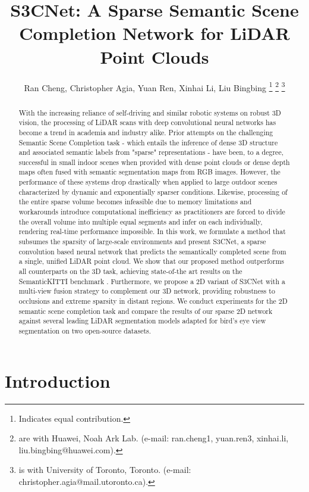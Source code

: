 \documentclass{article}
\title{S3CNet: A Sparse Semantic Scene Completion Network for LiDAR Point Clouds}
\author{
Ran Cheng, Christopher Agia, Yuan Ren, Xinhai Li, Liu Bingbing
\thanks{ Indicates equal contribution.}
\thanks{ are with Huawei, Noah Ark Lab. (e-mail: {ran.cheng1, yuan.ren3, xinhai.li, liu.bingbing}@huawei.com).}
\thanks{ is with University of Toronto, Toronto. (e-mail: christopher.agia@mail.utoronto.ca).}
}
\begin{document}
\maketitle



\begin{abstract}
    With the increasing reliance of self-driving and similar robotic systems on robust 3D vision, the processing of LiDAR scans with deep convolutional neural networks has become a trend in academia and industry alike. Prior attempts on the challenging Semantic Scene Completion task - which entails the inference of dense 3D structure and associated semantic labels from "sparse" representations - have been, to a degree, successful in small indoor scenes when provided with dense point clouds or dense depth maps often fused with semantic segmentation maps from RGB images. However, the performance of these systems drop drastically when applied to large outdoor scenes characterized by dynamic and exponentially sparser conditions. Likewise, processing of the entire sparse volume becomes infeasible due to memory limitations and workarounds introduce computational inefficiency as practitioners are forced to divide the overall volume into multiple equal segments and infer on each individually, rendering real-time performance impossible. In this work, we formulate a method that subsumes the sparsity of large-scale environments and present S3CNet, a sparse convolution based neural network that predicts the semantically completed scene from a single, unified LiDAR point cloud. We show that our proposed method outperforms all counterparts on the 3D task, achieving state-of-the art results on the SemanticKITTI benchmark \cite{behley2019semantickitti}. Furthermore, we propose a 2D variant of S3CNet with a multi-view fusion strategy to complement our 3D network, providing robustness to occlusions and extreme sparsity in distant regions. We conduct experiments for the 2D semantic scene completion task and compare the results of our sparse 2D network against several leading LiDAR segmentation models adapted for bird's eye view segmentation on two open-source datasets.
\end{abstract}




\section{Introduction}
	
\end{document}
